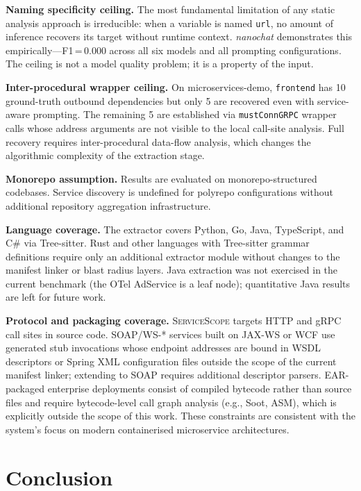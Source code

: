 \documentclass[runningheads]{llncs}
\begin{document}
\textbf{Naming specificity ceiling.} The most fundamental limitation of
any static analysis approach is irreducible: when a variable is named
\texttt{url}, no amount of inference recovers its target without runtime
context. \emph{nanochat} demonstrates this empirically---F1\,=\,0.000
across all six models and all prompting configurations. The ceiling is not
a model quality problem; it is a property of the input.

\textbf{Inter-procedural wrapper ceiling.} On microservices-demo,
\texttt{frontend} has 10 ground-truth outbound dependencies but only 5 are
recovered even with service-aware prompting. The remaining 5 are
established via \texttt{mustConnGRPC} wrapper calls whose address arguments
are not visible to the local call-site analysis. Full recovery requires
inter-procedural data-flow analysis, which changes the algorithmic
complexity of the extraction stage.

\textbf{Monorepo assumption.} Results are evaluated on monorepo-structured
codebases. Service discovery is undefined for polyrepo configurations
without additional repository aggregation infrastructure.

\textbf{Language coverage.} The extractor covers Python, Go, Java,
TypeScript, and C\# via Tree-sitter. Rust and other languages with Tree-sitter
grammar definitions require only an additional extractor module without
changes to the manifest linker or blast radius layers. Java extraction
was not exercised in the current benchmark (the OTel AdService is a
leaf node); quantitative Java results are left for future work.

\textbf{Protocol and packaging coverage.} \textsc{ServiceScope} targets
HTTP and gRPC call sites in source code. SOAP/WS-* services built on
JAX-WS or WCF use generated stub invocations whose endpoint addresses
are bound in WSDL descriptors or Spring XML configuration files outside
the scope of the current manifest linker; extending to SOAP requires
additional descriptor parsers. EAR-packaged enterprise deployments consist
of compiled bytecode rather than source files and require bytecode-level
call graph analysis (e.g., Soot, ASM), which is explicitly outside the
scope of this work. These constraints are consistent with the system's
focus on modern containerised microservice architectures.

\section{Conclusion}
\label{sec:conclusion}
\end{document}
